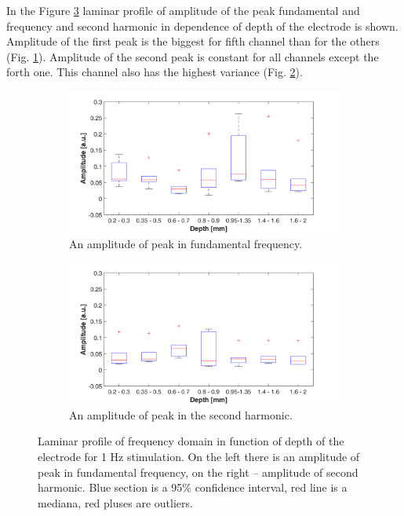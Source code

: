 \documentclass{pracalicmgr}
\begin{document}
In the Figure \ref{rys:profil_1Hz_wid} laminar profile of amplitude of the peak fundamental and frequency and second harmonic in dependence of depth of the electrode is shown. Amplitude of the first peak is the biggest for fifth channel than for the others (Fig. \ref{rys:profil_1Hz_wid1}). Amplitude of the second peak is constant for all channels except the forth one. This channel also has the highest variance (Fig. \ref{rys:profil_1Hz_wid2}).


\begin{figure}[H]
	\begin{subfigure}{.5\textwidth}
		\centering
		\includegraphics[width=1.\linewidth]{profile_1Hz_wid.png}
		\caption{An amplitude of peak in fundamental frequency.}
		\label{rys:profil_1Hz_wid1}
	\end{subfigure}%
	\begin{subfigure}{.5\textwidth}
		\centering
		\includegraphics[width=1.\linewidth]{profile_1Hz_wid2.png}
		\caption{An amplitude of peak in the second harmonic.}
		\label{rys:profil_1Hz_wid2}
	\end{subfigure}
	
	\caption{Laminar profile of frequency domain in function of depth of the electrode for 1 Hz stimulation. On the left there is an amplitude of peak in fundamental frequency, on the right -- amplitude of second harmonic. Blue section is a 95\% confidence interval, red line is a mediana, red pluses are outliers. }
	\label{rys:profil_1Hz_wid}
\end{figure}
\end{document}
